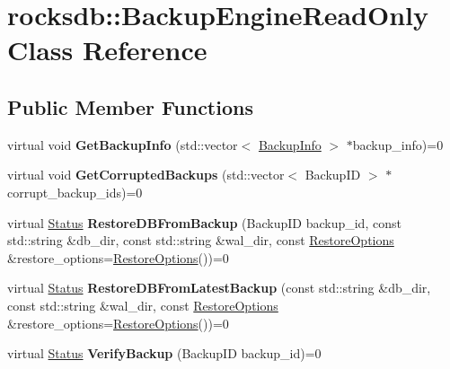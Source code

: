 \hypertarget{classrocksdb_1_1BackupEngineReadOnly}{}\section{rocksdb\+:\+:Backup\+Engine\+Read\+Only Class Reference}
\label{classrocksdb_1_1BackupEngineReadOnly}
\subsection*{Public Member Functions}
\begin{DoxyCompactItemize}
\item 
virtual void {\bfseries Get\+Backup\+Info} (std\+::vector$<$ \hyperlink{structrocksdb_1_1BackupInfo}{Backup\+Info} $>$ $\ast$backup\+\_\+info)=0\hypertarget{classrocksdb_1_1BackupEngineReadOnly_ab0fcb2fb57321bd8ad8f95bfec12b000}{}\label{classrocksdb_1_1BackupEngineReadOnly_ab0fcb2fb57321bd8ad8f95bfec12b000}

\item 
virtual void {\bfseries Get\+Corrupted\+Backups} (std\+::vector$<$ Backup\+ID $>$ $\ast$corrupt\+\_\+backup\+\_\+ids)=0\hypertarget{classrocksdb_1_1BackupEngineReadOnly_a12e6f7c1ac7db97dfa076b118fa7c3d6}{}\label{classrocksdb_1_1BackupEngineReadOnly_a12e6f7c1ac7db97dfa076b118fa7c3d6}

\item 
virtual \hyperlink{classrocksdb_1_1Status}{Status} {\bfseries Restore\+D\+B\+From\+Backup} (Backup\+ID backup\+\_\+id, const std\+::string \&db\+\_\+dir, const std\+::string \&wal\+\_\+dir, const \hyperlink{structrocksdb_1_1RestoreOptions}{Restore\+Options} \&restore\+\_\+options=\hyperlink{structrocksdb_1_1RestoreOptions}{Restore\+Options}())=0\hypertarget{classrocksdb_1_1BackupEngineReadOnly_aa86715641468f7db8869944189a66792}{}\label{classrocksdb_1_1BackupEngineReadOnly_aa86715641468f7db8869944189a66792}

\item 
virtual \hyperlink{classrocksdb_1_1Status}{Status} {\bfseries Restore\+D\+B\+From\+Latest\+Backup} (const std\+::string \&db\+\_\+dir, const std\+::string \&wal\+\_\+dir, const \hyperlink{structrocksdb_1_1RestoreOptions}{Restore\+Options} \&restore\+\_\+options=\hyperlink{structrocksdb_1_1RestoreOptions}{Restore\+Options}())=0\hypertarget{classrocksdb_1_1BackupEngineReadOnly_a1758914b174f7b0621f553f5bf6cab85}{}\label{classrocksdb_1_1BackupEngineReadOnly_a1758914b174f7b0621f553f5bf6cab85}

\item 
virtual \hyperlink{classrocksdb_1_1Status}{Status} {\bfseries Verify\+Backup} (Backup\+ID backup\+\_\+id)=0\hypertarget{classrocksdb_1_1BackupEngineReadOnly_a74dbf742dc27d7303851483fe242a2ae}{}\label{classrocksdb_1_1BackupEngineReadOnly_a74dbf742dc27d7303851483fe242a2ae}

\end{DoxyCompactItemize}

